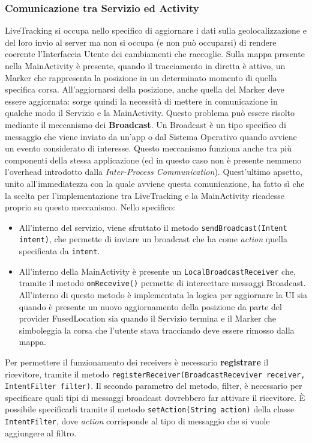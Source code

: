                             \subsubsection{Comunicazione tra Servizio ed Activity}
                                LiveTracking si occupa nello specifico di aggiornare i dati sulla geolocalizzazione e del loro invio al server ma non si occupa (e non può occuparsi) di rendere coerente l'Interfaccia Utente dei cambiamenti che raccoglie. Sulla mappa presente nella MainActivity è presente, quando il tracciamento in diretta è attivo, un Marker che rappresenta la posizione in un determinato momento di quella specifica corsa. All'aggiornarsi della posizione, anche quella del Marker deve essere aggiornata: sorge quindi la necessità di mettere in comunicazione in qualche modo il Servizio e la MainActivity. Questo problema può essere risolto mediante il meccanismo dei \textbf{Broadcast}. Un Broadcast è un tipo specifico di messaggio che viene inviato da un'app o dal Sistema Operativo quando avviene un evento considerato di interesse. Questo meccanismo funziona anche tra più componenti della stessa applicazione (ed in questo caso non è presente nemmeno l'overhead introdotto dalla \textit{Inter-Process Communication}). Quest'ultimo apsetto, unito all'immediatezza con la quale avviene questa comunicazione, ha fatto sì che la scelta per l'implementazione tra LiveTracking e la MainActivity ricadesse proprio su questo meccanismo. Nello specifico: 
                                \begin{itemize}
                                    \item All'interno del servizio, viene sfruttato il metodo \texttt{sendBroadcast(Intent intent)}, che permette di inviare un broadcast che ha come \textit{action} quella specificata da \texttt{intent}.
                                    \item All'interno della MainActivity è presente un \texttt{LocalBroadcastReceiver} che, tramite il metodo \texttt{onRecevive()} permette di intercettare messaggi Broadcast. All'interno di questo metodo è implementata la logica per aggiornare la UI sia quando è presente un nuovo aggiornamento della posizione da parte del provider FusedLocation sia quando il Servizio termina e il Marker che simboleggia la corsa che l'utente stava tracciando deve essere rimosso dalla mappa.
                                \end{itemize}

                                Per permettere il funzionamento dei receivers è necessario \textbf{registrare} il ricevitore, tramite il metodo
                                \texttt{registerReceiver(BroadcastReceviver receiver, IntentFilter filter)}.
                                Il secondo parametro del metodo, filter, è necessario per specificare quali tipi di messaggi broadcast dovrebbero far attivare il ricevitore. È possibile specificarli tramite il metodo \texttt{setAction(String action)} della classe \texttt{IntentFilter}, dove \textit{action} corrisponde al tipo di messaggio che si vuole aggiungere al filtro.              